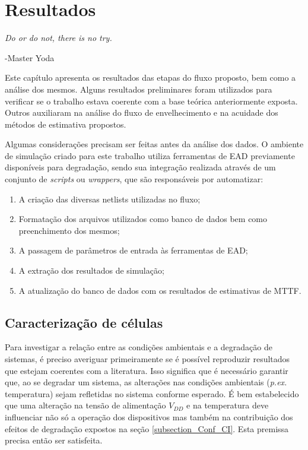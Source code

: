 \chapter{Resultados}
\epigraph{\textit{Do or do not, there is no try.}}{-Master Yoda}
\label{section:Resultados}
Este capítulo apresenta os resultados das etapas do fluxo proposto, bem como a análise dos mesmos. Alguns resultados preliminares foram utilizados para verificar se o trabalho estava coerente com a base teórica anteriormente exposta. Outros auxiliaram na análise do fluxo de envelhecimento e na acuidade dos métodos de estimativa propostos.

Algumas considerações precisam ser feitas antes da análise dos dados. O ambiente de simulação criado para este trabalho utiliza ferramentas de EAD previamente disponíveis para degradação, sendo sua integração realizada através de um conjunto de \textit{scripts} ou \textit{wrappers}, que são responsáveis por automatizar:
\begin{enumerate}
	\item A criação das diversas netlists utilizadas no fluxo;
	\item Formatação dos arquivos utilizados como banco de dados bem como preenchimento dos mesmos;
	\item A passagem de parâmetros de entrada às ferramentas de EAD;
	\item A extração dos resultados de simulação;
	\item A atualização do banco de dados com os resultados de estimativas de MTTF.
\end{enumerate}

\section{Caracterização de células}
\label{section:caracterização}
Para investigar a relação entre as condições ambientais e a degradação de sistemas, é preciso averiguar primeiramente se é possível reproduzir resultados que estejam coerentes com a literatura. Isso significa que é necessário garantir que, ao se degradar um sistema, as alterações nas condições ambientais (\textit{p.ex.} temperatura) sejam refletidas no sistema conforme esperado. É bem estabelecido que uma alteração na tensão de alimentação $V_{DD}$ e na temperatura deve influenciar não só a operação dos dispositivos mas também na contribuição dos efeitos de degradação expostos na seção \ref{subsection_Conf_CI}. Esta premissa precisa então ser satisfeita.

